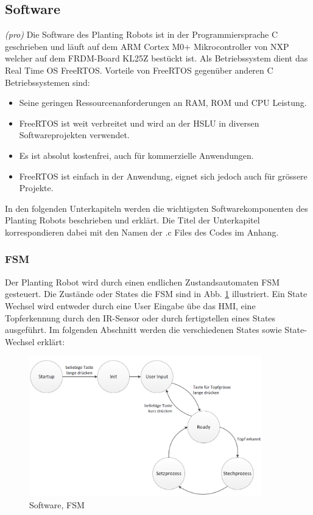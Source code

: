 \subsection{Software} \label{sec:Software}
\textit{(pro)} Die Software des Planting Robots ist in der Programmiersprache C geschrieben und läuft auf dem ARM Cortex M0+ Mikrocontroller von NXP welcher auf dem FRDM-Board KL25Z bestückt ist. Als Betriebssystem dient das Real Time OS FreeRTOS. Vorteile von FreeRTOS gegenüber anderen C Betriebssystemen sind:

\begin{itemize}
	\item Seine geringen Ressourcenanforderungen an RAM, ROM und CPU Leistung. 
	\item FreeRTOS ist weit verbreitet und wird an der HSLU in diversen Softwareprojekten verwendet.
	\item Es ist absolut kostenfrei, auch für kommerzielle Anwendungen.
	\item FreeRTOS ist einfach in der Anwendung, eignet sich jedoch auch für grössere Projekte.
\end{itemize}

In den folgenden Unterkapiteln werden die wichtigsten Softwarekomponenten des Planting Robots beschrieben und erklärt. Die Titel der Unterkapitel korrespondieren dabei mit den Namen der .c Files des Codes im Anhang.

\subsubsection{FSM}
Der Planting Robot wird durch einen endlichen Zustandsautomaten FSM gesteuert. Die Zustände oder States die FSM sind in Abb. \ref{fig:FSM} illustriert. Ein State Wechsel wird entweder durch eine User Eingabe übe das HMI, eine Topferkennung durch den IR-Sensor oder durch fertigstellen eines States ausgeführt. Im folgenden Abschnitt werden die verschiedenen States sowie State-Wechsel erklärt:

\begin{figure}[H]
	\includegraphics[width=0.9\textwidth]{Illustrationen/6-Umsetzung/FSM_B&W_breit.png}
	\caption{Software, FSM}
	\label{fig:FSM}
\end{figure}

